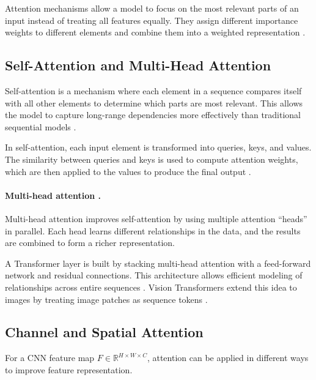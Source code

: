 Attention mechanisms allow a model to focus on the most relevant parts of an input instead of treating all features equally. They assign different importance weights to different elements and combine them into a weighted representation \cite{vaswani_attention_2017}.

\subsection{Self-Attention and Multi-Head Attention}
\label{sec:bg:selfattn}

Self-attention is a mechanism where each element in a sequence compares itself with all other elements to determine which parts are most relevant. This allows the model to capture long-range dependencies more effectively than traditional sequential models \cite{vaswani_attention_2017}.

In self-attention, each input element is transformed into queries, keys, and values. The similarity between queries and keys is used to compute attention weights, which are then applied to the values to produce the final output \cite{vaswani_attention_2017}.

\paragraph{Multi-head attention \cite{vaswani_attention_2017}.}
Multi-head attention improves self-attention by using multiple attention “heads” in parallel. Each head learns different relationships in the data, and the results are combined to form a richer representation.

A Transformer layer is built by stacking multi-head attention with a feed-forward network and residual connections. This architecture allows efficient modeling of relationships across entire sequences \cite{vaswani_attention_2017}. Vision Transformers extend this idea to images by treating image patches as sequence tokens \cite{su_leveraging_2024}.

\subsection{Channel and Spatial Attention}\label{sec:bg:channel_spatial}

For a \ac{CNN} feature map $F \in \mathbb{R}^{H \times W \times C}$, attention can be applied in different ways to improve feature representation.

